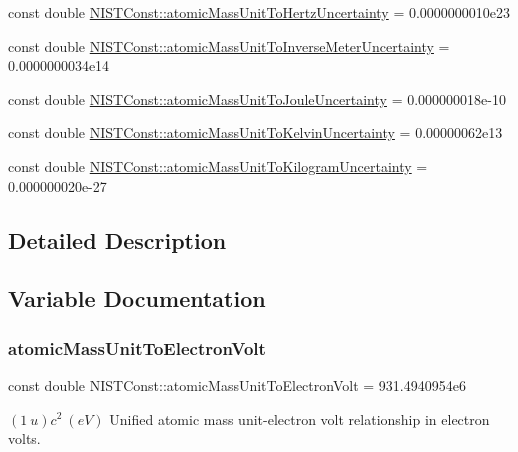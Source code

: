 \begin{DoxyCompactItemize}
\item 
const double \hyperlink{group___n_i_s_t_const-_atomic_mass_unit_gab009bca22e1cbed231798616f659b353}{N\+I\+S\+T\+Const\+::atomic\+Mass\+Unit\+To\+Hertz\+Uncertainty} = 0.\+0000000010e23
\item 
const double \hyperlink{group___n_i_s_t_const-_atomic_mass_unit_gae2ac6f33619c73c37ef774ca7088844a}{N\+I\+S\+T\+Const\+::atomic\+Mass\+Unit\+To\+Inverse\+Meter\+Uncertainty} = 0.\+0000000034e14
\item 
const double \hyperlink{group___n_i_s_t_const-_atomic_mass_unit_ga0d86dc8fac39e6589510009376d261d6}{N\+I\+S\+T\+Const\+::atomic\+Mass\+Unit\+To\+Joule\+Uncertainty} = 0.\+000000018e-\/10
\item 
const double \hyperlink{group___n_i_s_t_const-_atomic_mass_unit_ga124459785d7b4bcbc5a97ed591d859ae}{N\+I\+S\+T\+Const\+::atomic\+Mass\+Unit\+To\+Kelvin\+Uncertainty} = 0.\+00000062e13
\item 
const double \hyperlink{group___n_i_s_t_const-_atomic_mass_unit_ga8726643b734abfa2cc6c41b98f59f8c2}{N\+I\+S\+T\+Const\+::atomic\+Mass\+Unit\+To\+Kilogram\+Uncertainty} = 0.\+000000020e-\/27
\end{DoxyCompactItemize}


\subsection{Detailed Description}


\subsection{Variable Documentation}
\mbox{\label{group___n_i_s_t_const-_atomic_mass_unit_ga4a5d912289e6a828a25e9e7ae3385b0d}} 
\subsubsection{\texorpdfstring{atomic\+Mass\+Unit\+To\+Electron\+Volt}{atomicMassUnitToElectronVolt}}
{\footnotesize\ttfamily const double N\+I\+S\+T\+Const\+::atomic\+Mass\+Unit\+To\+Electron\+Volt = 931.\+4940954e6}

$(1\ u)c^2 \ (eV)$ Unified atomic mass unit-\/electron volt relationship in electron volts. \mbox{\label{group___n_i_s_t_const-_atomic_mass_unit_ga5b9ec7f36c14dabc54a16d1e076bee14}} 
